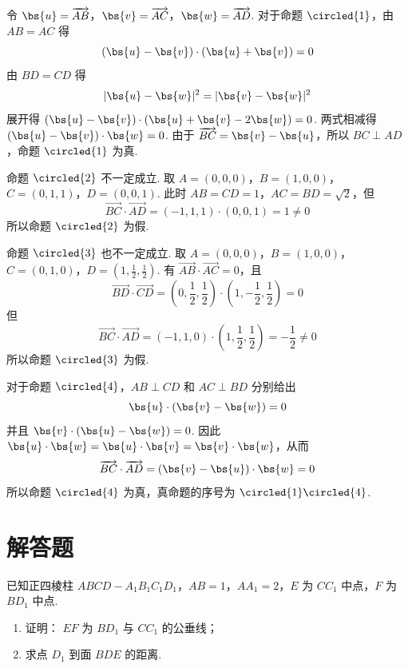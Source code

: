 \begin{solution}
令 \(\bs{u}=\overrightarrow{AB}\)，\(\bs{v}=\overrightarrow{AC}\)，\(\bs{w}=\overrightarrow{AD}\).
对于命题 \(\circled{1}\)，由 \(AB=AC\) 得
\[
(\bs{u}-\bs{v})\cdot(\bs{u}+\bs{v})=0
\]
由 \(BD=CD\) 得
\[
|\bs{u}-\bs{w}|^2=|\bs{v}-\bs{w}|^2
\]
展开得 \((\bs{u}-\bs{v})\cdot(\bs{u}+\bs{v}-2\bs{w})=0\).
两式相减得 \((\bs{u}-\bs{v})\cdot\bs{w}=0\). 由于 \(\overrightarrow{BC}=\bs{v}-\bs{u}\)，所以 \(BC\perp AD\)，命题 \(\circled{1}\) 为真.

命题 \(\circled{2}\) 不一定成立. 取
\(A=(0,0,0)\)，\(B=(1,0,0)\)，\(C=(0,1,1)\)，\(D=(0,0,1)\).
此时 \(AB=CD=1\)，\(AC=BD=\sqrt2\)，但
\[
\overrightarrow{BC}\cdot\overrightarrow{AD}=(-1,1,1)\cdot(0,0,1)=1\neq0
\]
所以命题 \(\circled{2}\) 为假.

命题 \(\circled{3}\) 也不一定成立. 取
\(A=(0,0,0)\)，\(B=(1,0,0)\)，\(C=(0,1,0)\)，\(D=\left(1,\frac12,\frac12\right)\).
有 \(\overrightarrow{AB}\cdot\overrightarrow{AC}=0\)，且
\[
\overrightarrow{BD}\cdot\overrightarrow{CD}
=\left(0,\frac12,\frac12\right)\cdot\left(1,-\frac12,\frac12\right)=0
\]
但
\[
\overrightarrow{BC}\cdot\overrightarrow{AD}=(-1,1,0)\cdot\left(1,\frac12,\frac12\right)=-\frac12\neq0
\]
所以命题 \(\circled{3}\) 为假.

对于命题 \(\circled{4}\)，\(AB\perp CD\) 和 \(AC\perp BD\) 分别给出
\[
\bs{u}\cdot(\bs{v}-\bs{w})=0
\]
并且 \(\bs{v}\cdot(\bs{u}-\bs{w})=0\).
因此 \(\bs{u}\cdot\bs{w}=\bs{u}\cdot\bs{v}=\bs{v}\cdot\bs{w}\)，从而
\[
\overrightarrow{BC}\cdot\overrightarrow{AD}=(\bs{v}-\bs{u})\cdot\bs{w}=0
\]
所以命题 \(\circled{4}\) 为真，真命题的序号为 \(\circled{1}\circled{4}\).
\end{solution}

\section{解答题}
\begin{problem}
已知正四棱柱 \(ABCD - A_{1}B_{1}C_{1}D_{1}\)，\(AB = 1\)，\(AA_{1} = 2\)，\(E\) 为 \(CC_{1}\) 中点，\(F\) 为 \(BD_{1}\) 中点.

\begin{enumerate}
\item 证明： \(EF\) 为 \(BD_{1}\) 与 \(CC_{1}\) 的公垂线；
\item 求点 \(D_{1}\) 到面 \(BDE\) 的距离.
\end{enumerate}

\end{problem}

